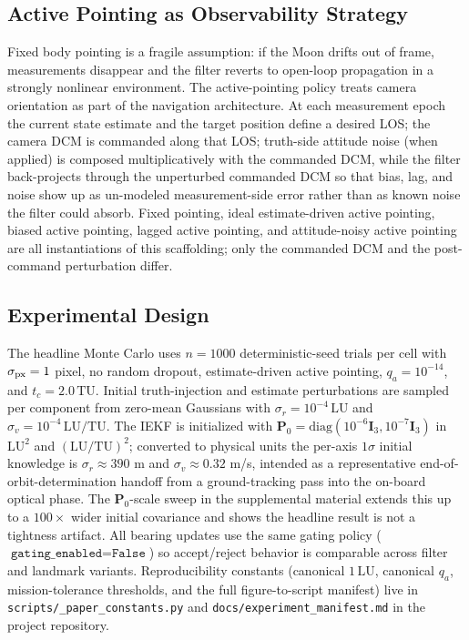 \documentclass[10pt,twocolumn]{article}
\newcommand{\vect}[1]{\mathbf{#1}}
\newcommand{\mat}[1]{\mathbf{#1}}
\newcommand{\LU}{\mathrm{LU}}
\newcommand{\TU}{\mathrm{TU}}
\begin{document}
\subsection{Active Pointing as Observability Strategy}
Fixed body pointing is a fragile assumption: if the Moon drifts out of frame, measurements disappear and the filter reverts to open-loop propagation in a strongly nonlinear environment.  The active-pointing policy treats camera orientation as part of the navigation architecture.  At each measurement epoch the current state estimate and the target position define a desired LOS; the camera DCM is commanded along that LOS; truth-side attitude noise (when applied) is composed multiplicatively with the commanded DCM, while the filter back-projects through the unperturbed commanded DCM so that bias, lag, and noise show up as un-modeled measurement-side error rather than as known noise the filter could absorb.  Fixed pointing, ideal estimate-driven active pointing, biased active pointing, lagged active pointing, and attitude-noisy active pointing are all instantiations of this scaffolding; only the commanded DCM and the post-command perturbation differ.

\subsection{Experimental Design}
The headline Monte Carlo uses $n=1000$ deterministic-seed trials per cell with $\sigma_{\rm px}=1$ pixel, no random dropout, estimate-driven active pointing, $q_a=10^{-14}$, and $t_c=2.0\,\TU$.  Initial truth-injection and estimate perturbations are sampled per component from zero-mean Gaussians with $\sigma_r=10^{-4}\,\LU$ and $\sigma_v=10^{-4}\,\LU/\TU$.  The IEKF is initialized with $\vect{P}_0=\mathrm{diag}(10^{-6}\mat{I}_3,10^{-7}\mat{I}_3)$ in $\LU^2$ and $(\LU/\TU)^2$; converted to physical units the per-axis $1\sigma$ initial knowledge is $\sigma_r\approx 390$ m and $\sigma_v\approx 0.32$ m/s, intended as a representative end-of-orbit-determination handoff from a ground-tracking pass into the on-board optical phase.  The $\vect{P}_0$-scale sweep in the supplemental material extends this up to a $100\times$ wider initial covariance and shows the headline result is not a tightness artifact.  All bearing updates use the same gating policy ($\texttt{gating\_enabled}=\texttt{False}$) so accept/reject behavior is comparable across filter and landmark variants.  Reproducibility constants (canonical $1\,\LU$, canonical $q_a$, mission-tolerance thresholds, and the full figure-to-script manifest) live in \texttt{scripts/\_paper\_constants.py} and \texttt{docs/experiment\_manifest.md} in the project repository.
\end{document}
